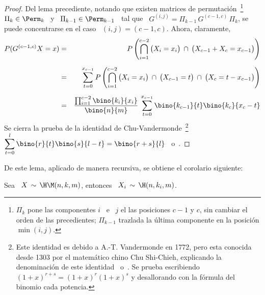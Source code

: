 %
\begin{proof}
 Del  lema precediente,
  notando  que  existen  matrices  de permutaci\'on~\footnote{$\Pi_k$  pone  las
    componentes $i$ \ e \ $j$ el  las posiciones $c-1$ y $c$, sin cambiar el orden
    de  las  precedientes;  $\Pi_{k-1}$  trazlada  la  \'ultima  componente  en  la
    posici\'on $\min(i,j)$.}  \ $\Pi_k \in  \Perm_k$ \ y \ $\Pi_{k-1} \in
  \Perm_{k-1}$ \ tal que \ $G^{(i,j)} = \Pi_{k-1} \, G^{(c-1,c)} \, \Pi_k$,
  se puede concentrarse en el caso \ $(i,j) = (c-1,c)$. Ahora, claramente,
  \begin{eqnarray*}
  P(G^{(c-1,c)} X = x) & = & \displaystyle P\left( \bigcap_{i=1}^{c-2} \big( X_i = x_i \big)
  \: \cap \: \big( X_{c-1} + X_c = x_{c-1} \big) \right)\\[2mm]
  & = & \displaystyle \sum_{t=0}^{x_{c-1}} P\left( \bigcap_{i=1}^{c-2} \big( X_i = x_i \big)
  \: \cap \: \big( X_{c-1} = t\big) \: \cap \: \big( X_c = t-x_{c-1} \big) \right)\\[2mm]
  & = & \frac{\prod_{i=1}^{c-2} \bino{k_i}{x_i}}{\bino{n}{m}}
  \: \sum_{t=0}^{x_{c-1}} \bino{k_{c-1}}{t}\bino{k_c}{x_c-t}
  \end{eqnarray*}
  Se  cierra  la  prueba   de  la  identidad  de  Chu-Vandermonde~\footnote{Este
    identidad es  debido a A.-T. Vandermonde  en 1772, pero  esta conocida desde
    1303 por  el matem\'atico chino Chu Shi-Chieh,  explicando la denominaci\'on
    de  este   identidad~\cite{AndLar94}  o~\cite[p.~59-60]{Ask75}.   Se  prueba
    escribiendo $(1+x)^{r+s} = (1+x)^r  (1+x)^s$ y desallorando con la f\'ormula
    del     binomio    cada     potencia.}      $\displaystyle    \sum_{t=0}^{l}
  \bino{r}{t}\bino{s}{l-t}   =  \bino{r+s}{l}$~\cite[Ec.~(21),  p.~59]{Knu97_v1}
  o~\cite[Ec.~0.156]{GraRyz15}.
\end{proof}

De este lema, aplicado de manera recursiva, se obtiene el corolario siguiente:
%
\begin{corolario}\label{Cor:MP:MarginalMultinomial}
%
  Sea  \ $X  \,  \sim \,  \H\M(n,k,m)$, entonces  \  $\displaystyle X_i  \, \sim  \,
  \H(n,k_i,m)$.
\end{corolario}


